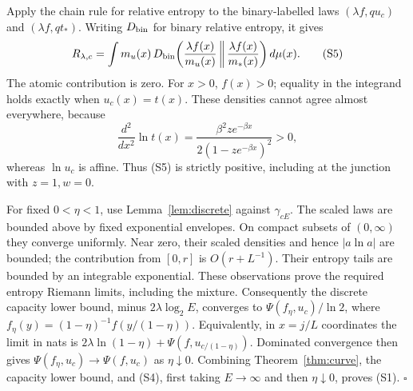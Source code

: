 \documentclass[11pt]{article}
\begin{document}
Apply the chain rule for relative entropy to the binary-labelled
laws \((\lambda f,qu_c)\) and \((\lambda f,qt_*)\).
Writing \(D_{\rm bin}\) for binary relative entropy, it gives
\[
 R_{\lambda,c}
 =\int m_u(x)\,
 D_{\rm bin}\!\left(\frac{\lambda f(x)}{m_u(x)}
              \,\middle\Vert\,\frac{\lambda f(x)}{m_*(x)}\right)d\mu(x).
                                                                    \tag{S5}
\]
The atomic contribution is zero. For \(x>0\), \(f(x)>0\); equality
in the integrand holds exactly when \(u_c(x)=t(x)\).
These densities cannot agree almost everywhere, because
\[
 \frac{d^2}{dx^2}\ln t(x)
 =\frac{\beta^2ze^{-\beta x}}{2(1-ze^{-\beta x})^2}>0,           \tag{S6}
\]
whereas \(\ln u_c\) is affine. Thus (S5) is strictly positive,
including at the junction with \(z=1,w=0\).

For fixed \(0<\eta<1\), use Lemma~\ref{lem:discrete} against \(\gamma_{cE}\).
The scaled laws are bounded above by fixed exponential envelopes.
On compact subsets of \((0,\infty)\) they converge uniformly.
Near zero, their scaled densities and hence \(|a\ln a|\) are bounded;
the contribution from \([0,r]\) is \(O(r+L^{-1})\).
Their entropy tails are bounded by an integrable exponential.
These observations prove the required entropy Riemann limits,
including the mixture. Consequently the discrete capacity lower bound, minus
\(2\lambda\log_2E\), converges to
\(\Psi(f_\eta,u_c)/\ln2\), where
\(f_\eta(y)=(1-\eta)^{-1}f(y/(1-\eta))\).
Equivalently, in \(x=j/L\) coordinates the limit in nats is
\(2\lambda\ln(1-\eta)+\Psi(f,u_{c/(1-\eta)})\).
Dominated convergence then gives
\(\Psi(f_\eta,u_c)\to\Psi(f,u_c)\) as \(\eta\downarrow0\).
Combining Theorem~\ref{thm:curve}, the capacity lower bound, and (S4), first taking \(E\to\infty\) and then
\(\eta\downarrow0\), proves (S1). \(\square\)
\end{document}
